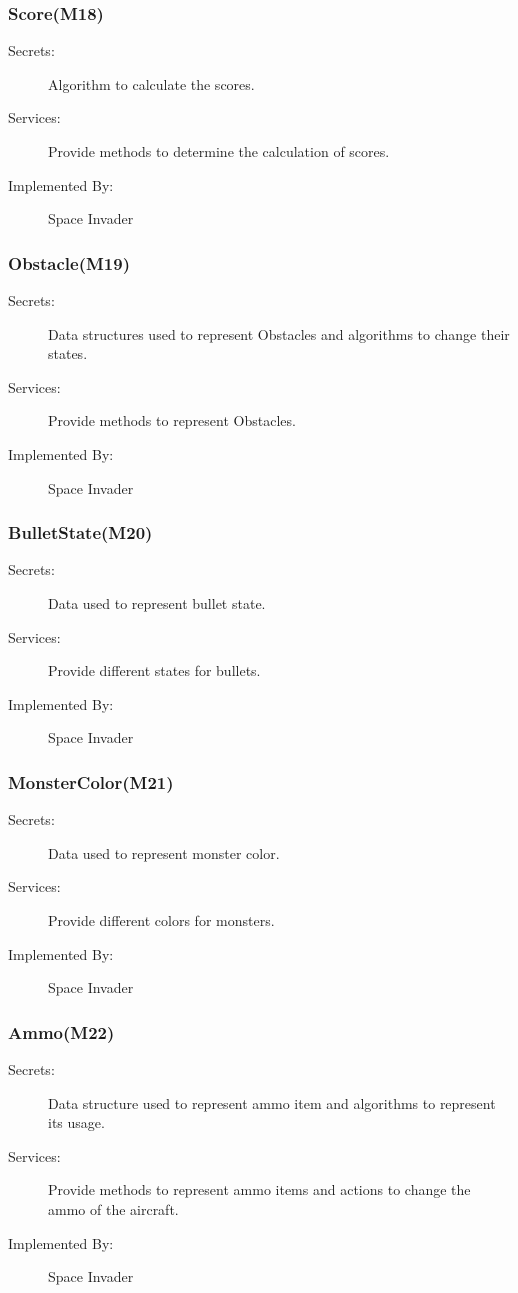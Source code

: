 \documentclass[12pt]{article}
\begin{document}
\subsubsection{Score(M18)}
\begin{description}
\item[Secrets:] Algorithm to calculate the scores.
\item[Services:] Provide methods to determine the calculation of scores. 
\item[Implemented By:] Space Invader
\end{description}

\subsubsection{Obstacle(M19)}
\begin{description}
\item[Secrets:] Data structures used to represent Obstacles and algorithms to change their states.
\item[Services:] Provide methods to represent Obstacles. 
\item[Implemented By:] Space Invader
\end{description}

\subsubsection{BulletState(M20)}
\begin{description}
\item[Secrets:] Data used to represent bullet state.
\item[Services:] Provide different states for bullets. 
\item[Implemented By:] Space Invader
\end{description}

\subsubsection{MonsterColor(M21)}
\begin{description}
\item[Secrets:] Data used to represent monster color.
\item[Services:] Provide different colors for monsters. 
\item[Implemented By:] Space Invader
\end{description}

\subsubsection{Ammo(M22)}
\begin{description}
\item[Secrets:] Data structure used to represent ammo item and algorithms to represent its usage.
\item[Services:] Provide methods to represent ammo items and actions to change the ammo of the aircraft. 
\item[Implemented By:] Space Invader
\end{description}
\end{document}
